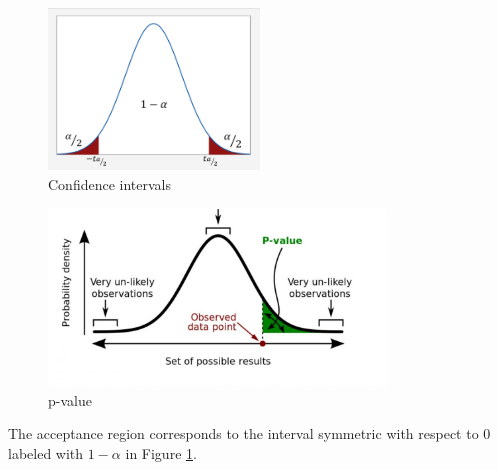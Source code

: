 \begin{figure} [ht]
    \centering
    \includegraphics[width=0.5\textwidth]{images/test_distr_normale.png}
    \caption{Confidence intervals}
    \label{fig:confidence_intervals}
\end{figure}
\begin{figure} [ht]
    \centering
    \includegraphics[width=0.8\textwidth]{images/p-value.jpg}
    \caption{p-value}
    \label{fig:p_value}
\end{figure}


The acceptance region corresponds to the interval symmetric with respect to 0 labeled with $1-\alpha$ in Figure \ref{fig:confidence_intervals}.

